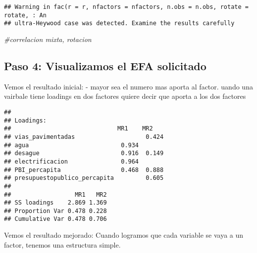 \documentclass[
]{article}
\newenvironment{Shaded}{\begin{snugshade}}{\end{snugshade}}
\newcommand{\CommentTok}[1]{\textcolor[rgb]{0.56,0.35,0.01}{\textit{#1}}}
\newcommand{\DataTypeTok}[1]{\textcolor[rgb]{0.13,0.29,0.53}{#1}}
\newcommand{\FloatTok}[1]{\textcolor[rgb]{0.00,0.00,0.81}{#1}}
\newcommand{\KeywordTok}[1]{\textcolor[rgb]{0.13,0.29,0.53}{\textbf{#1}}}
\newcommand{\NormalTok}[1]{#1}
\newcommand{\OperatorTok}[1]{\textcolor[rgb]{0.81,0.36,0.00}{\textbf{#1}}}
\begin{document}
\begin{verbatim}
## Warning in fac(r = r, nfactors = nfactors, n.obs = n.obs, rotate = rotate, : An
## ultra-Heywood case was detected. Examine the results carefully
\end{verbatim}

\begin{Shaded}
\begin{Highlighting}[]
\CommentTok{#correlacion mixta, rotacion}
\end{Highlighting}
\end{Shaded}

\hypertarget{paso-4-visualizamos-el-efa-solicitado}{%
\subsection{Paso 4: Visualizamos el EFA
solicitado}\label{paso-4-visualizamos-el-efa-solicitado}}

Vemos el resultado inicial: - mayor sea el numero mas aporta al factor.
uando una vairbale tiene loadings en dos factores quiere decir que
aporta a los dos factores

\begin{Shaded}
\end{Shaded}

\begin{verbatim}
## 
## Loadings:
##                              MR1    MR2   
## vias_pavimentadas                    0.424
## agua                          0.934       
## desague                       0.916  0.149
## electrificacion               0.964       
## PBI_percapita                 0.468  0.888
## presupuestopublico_percapita         0.605
## 
##                  MR1   MR2
## SS loadings    2.869 1.369
## Proportion Var 0.478 0.228
## Cumulative Var 0.478 0.706
\end{verbatim}

Vemos el resultado mejorado: Cuando logramos que cada variable se vaya a
un factor, tenemos una estructura simple.

\begin{Shaded}
\end{Shaded}
\end{document}

